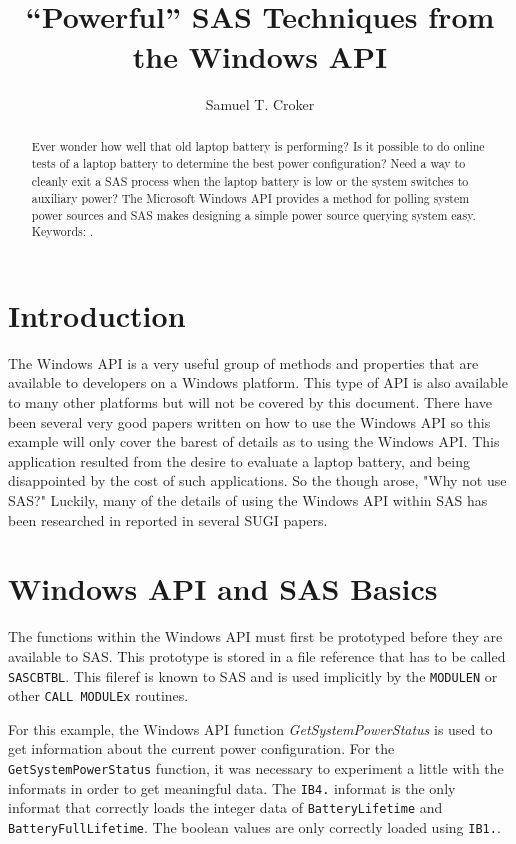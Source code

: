 \documentclass{sugconf}
\title{``Powerful''  SAS\textsuperscript{\scriptsize\textregistered} Techniques from the Windows API}
\author{Samuel T. Croker}
\begin{document}
\begin{abstract}Ever wonder how well that old laptop battery is performing?  Is it possible to do online tests of a laptop battery to determine the best power configuration?  Need a way to cleanly exit a SAS\textsuperscript{\scriptsize\textregistered} process when the laptop battery is low or the system switches to auxiliary power? The Microsoft Windows API provides a method for polling system power sources and SAS makes designing a simple power source querying system easy.
 Keywords: \SUGconfKeywords.
\end{abstract}

\section{Introduction}

The Windows API is a very useful group of methods and properties
that are available to developers on a Windows platform.  This type
of API is also available to many other platforms but will not be
covered by this document.  There have been several very good papers
written on how to use the Windows API so this example will only
cover the barest of details as to using the Windows API.  This application resulted from the desire to evaluate a laptop battery, and being disappointed by the cost of such applications.  So the though arose, "Why not use SAS?"  Luckily, many of the details of using the Windows API within SAS has been researched in reported in several SUGI papers.  

\section{Windows API and SAS Basics}
The functions within the Windows API must first be prototyped before
they are available to SAS.  This prototype is stored in a file
reference that has to be called \verb"SASCBTBL".  This fileref is
known to SAS and is used implicitly by the \verb"MODULEN" or other
\verb"CALL MODULEx" routines. 

For this example, the Windows API function \textit{GetSystemPowerStatus} is used to 
get information about the current power configuration.  For the \verb"GetSystemPowerStatus" function, it was necessary to experiment
a little with the informats in order to get meaningful data.  The
\verb"IB4." informat is the only informat that correctly loads the
integer data of \verb"BatteryLifetime" and
\verb"BatteryFullLifetime".  The boolean values are only correctly
loaded using \verb"IB1.".  
\end{document}
